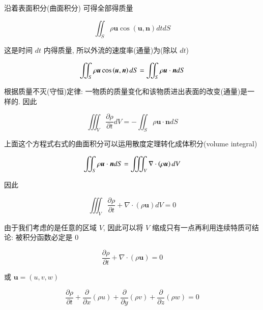 \documentclass[11pt]{article}
\begin{document}
沿着表面积分(曲面积分) 可得全部得质量

\begin{equation}
\iint_S {\rho \boldsymbol{u}\cos \left( {\boldsymbol{u},\boldsymbol{n}} \right)dtdS}
\label{eq5.1.4}
\end{equation}

这是时间 $ dt $ 内得质量, 所以外流的速度率(通量)为(除以 $ dt $)

\begin{equation}
\iint_S {\rho \boldsymbol{u}\cos \left( {\boldsymbol{u},\boldsymbol{n}} \right)dS} = \iint_S {\rho \boldsymbol{u} \cdot \boldsymbol{n}dS}
\notag 
\end{equation}

根据质量不灭(守恒)定律: 一物质的质量变化和该物质进出表面的改变(通量)是一样的. 因此

\begin{equation}
\iiint_V {\frac{{\partial \rho }}{{\partial t}}dV} =  - \iint_S {\rho \boldsymbol{u} \cdot \boldsymbol{n}dS}
\label{eq5.1.5}
\end{equation}

上面这个方程式右式的曲面积分可以运用散度定理转化成体积分(volume integral)

\begin{equation}
\iint_S {\rho \boldsymbol{u} \cdot \boldsymbol{n}dS} = \iiint_V {\nabla  \cdot \left( {\rho \boldsymbol{u}} \right)dV}
\notag
\end{equation}

因此

\begin{equation}
\iiint_V {\frac{{\partial \rho }}{{\partial t}} + \nabla  \cdot \left( {\rho \boldsymbol{u}} \right)dV} = 0
\label{eq5.1.6}
\end{equation}

由于我们考虑的是任意的区域 $ V $, 因此可以将 $ V $ 缩成只有一点再利用连续特质可结论: 被积分函数必定是 0

\begin{equation}
\frac{{\partial \rho }}{{\partial t}} + \nabla  \cdot \left( {\rho \boldsymbol{u}} \right) = 0
\label{eq5.1.7}
\end{equation}

或 $\boldsymbol{u} = \left( {u,v,w} \right)$

\begin{equation}
\frac{{\partial \rho }}{{\partial t}} + \frac{\partial }{{\partial x}}\left( {\rho u} \right) + \frac{\partial }{{\partial y}}\left( {\rho v} \right) + \frac{\partial }{{\partial z}}\left( {\rho w} \right) = 0
\label{eq5.1.8}
\end{equation}
\end{document}
